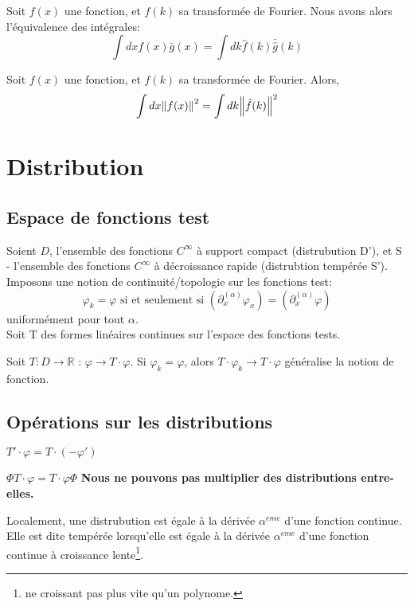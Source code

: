 \documentclass[../notesdecours.tex]{subfiles}
\begin{document}
\begin{theorem}[Plancherel]
Soit $f(x)$ une fonction, et $\hat{f}(k)$ sa transformée de Fourier. Nous avons alors l'équivalence des intégrales:
\begin{equation}
\int dx f(x)\bar{g}(x) = \int dk \hat{f}(k)\bar{\hat{g}}(k)
\end{equation}
\end{theorem}
\begin{theorem}
Soit $f(x)$ une fonction, et $\hat{f}(k)$ sa transformée de Fourier. Alors,
\begin{equation}
\int dx \norm{f(x)}^2 = \int dk \norm{\hat{f}(k)}^2
\end{equation}
\end{theorem}

\section{Distribution}
\subsection{Espace de fonctions test}
Soient $D$, l'ensemble des fonctions $C^\infty$ à support compact (distrubution D'), et S - l'ensemble des fonctions $C^\infty$ à décroissance rapide (distrubtion tempérée S').  Imposons une notion de continuité/topologie sur les fonctions test:
\begin{equation}
\varphi_k = \varphi \text{ si et seulement si } (\partial_x^{(\alpha)} \varphi_x) = (\partial_x^{(\alpha)}\varphi)
\end{equation}
uniformément pour tout $\alpha$.\\

Soit T des formes linéaires continues sur l'espace des fonctions tests.
\begin{Property}
Soit $T: D \rightarrow \mathbb{R}$ : $\varphi \rightarrow T\cdot\varphi$. Si $\varphi_k = \varphi$, alors $T\cdot\varphi_k \rightarrow T\cdot\varphi$ généralise la notion de fonction.
\end{Property}

\subsection{Opérations sur les distributions}
\begin{Property}
$T'\cdot\varphi = T\cdot(-\varphi')$
\end{Property}
\begin{Property}
$\Phi T\cdot\varphi = T\cdot\varphi\Phi$
\textbf{Nous ne pouvons pas multiplier des distributions entre-elles.}
\end{Property}
\begin{theorem}
Localement, une distrubution est égale à la dérivée $\alpha^{eme}$ d'une fonction continue. Elle est dite tempérée lorsqu'elle est égale à la dérivée $\alpha^{eme}$ d'une fonction continue à croissance lente\footnote{ne croissant pas plus vite qu'un polynome.}.
\end{theorem}
\end{document}
